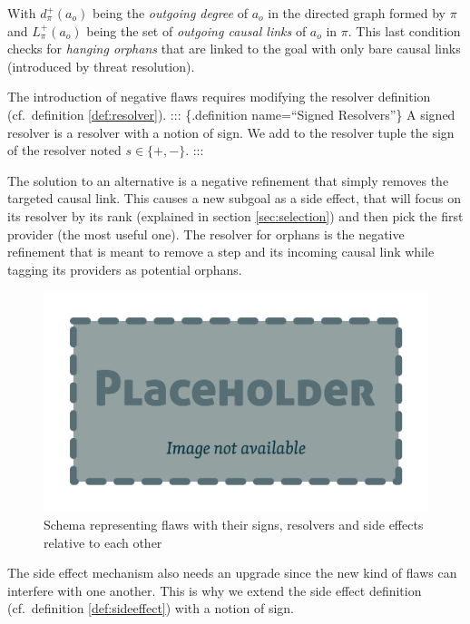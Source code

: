 \documentclass[11pt,a4paper,twoside,openright,titlepage,numbers=noenddot,headinclude,cleardoublepage=empty,openany]{scrreprt}
\theoremstyle{plain}
\theoremstyle{definition}
\theoremstyle{remark}
\begin{document}
With \(d_\pi^+(a_o)\) being the \emph{outgoing degree} of \(a_o\) in the
directed graph formed by \(\pi\) and \(L_\pi^+(a_o)\) being the set of
\emph{outgoing causal links} of \(a_o\) in \(\pi\). This last condition
checks for \emph{hanging orphans} that are linked to the goal with only
bare causal links (introduced by threat resolution).

The introduction of negative flaws requires modifying the resolver
definition (cf.~definition \ref{def:resolver}). ::: \{.definition
name=``Signed Resolvers''\} A signed resolver is a resolver with a
notion of sign. We add to the resolver tuple the sign of the resolver
noted \(s \in \{+, -\}\). :::

The solution to an alternative is a negative refinement that simply
removes the targeted causal link. This causes a new subgoal as a side
effect, that will focus on its resolver by its rank (explained in
section \ref{sec:selection}) and then pick the first provider (the most
useful one). The resolver for orphans is the negative refinement that is
meant to remove a step and its incoming causal link while tagging its
providers as potential orphans.

\begin{figure}
\hypertarget{fig:sideeffects}{%
\centering
\includegraphics{./tex2pdf.-0b80fea6fd6da7f9/85c5abcb21612ede4db12ac6fcfd32ed24ed57eb.pdf}
\caption{Schema representing flaws with their signs, resolvers and side
effects relative to each other}\label{fig:sideeffects}
}
\end{figure}

The side effect mechanism also needs an upgrade since the new kind of
flaws can interfere with one another. This is why we extend the side
effect definition (cf.~definition \ref{def:sideeffect}) with a notion of
sign.
\end{document}
